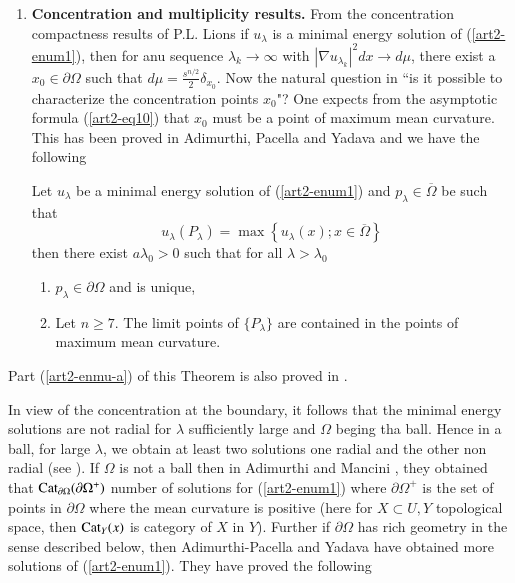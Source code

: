 \begin{enumerate}[{\rm \bf 1.}]
\item \textbf{Concentration and multiplicity results.} From the concentration compactness results of P.L. Lions \cite{art2-key17} if $u_{\lambda}$ is a minimal energy solution of (\ref{art2-enum1}), then for anu sequence $\lambda_{k} \rightarrow \infty$ with $|\nabla u_{\lambda_{k}}|^{2}dx \rightarrow d\mu$, there exist a $x_{0}\in \partial\Omega$ such that $d\mu = \frac{s^{n/2}}{2}\delta_{x_{0}}$. Now the natural question in ``is it possible to characterize the concentration points $x_{0}$"? One expects from the asymptotic formula (\ref{art2-eq10}) that $x_{0}$ must be a point of maximum mean curvature. This has been proved in Adimurthi, Pacella and Yadava \cite{art2-key7} and we have the following

\begin{theorem}\label{art2-thm6}
Let $u_{\lambda}$ be a minimal energy solution of (\ref{art2-enum1}) and $p_{\lambda} \in \overline{\Omega}$ be such that
$$
u_{\lambda}(P_{\lambda}) = \max\left\{u_{\lambda}(x) ; x\in \overline{\Omega}\right\}
$$
then there exist $a \lambda_{0} > 0$ such that for all $\lambda > \lambda_{0}$
\begin{enumerate}[{\rm a)}]
\item $p_{\lambda} \in \partial\Omega$ and is unique,\label{art2-enmu-a}
\item Let $n\geq 7$. The limit points of $\{P_{\lambda}\}$ are contained in the points of maximum mean curvature.\label{art2-enmu-b)} 
\end{enumerate}
\end{theorem}
\end{enumerate}
Part (\ref{art2-enmu-a}) of this Theorem is also proved in \cite{art2-key19}.

In view of the concentration at the boundary, it follows that the minimal energy solutions are not radial for $\lambda$ sufficiently large and $\Omega$ beging tha ball. Hence in a ball, for large $\lambda$, we obtain at  least two solutions one radial and the other non radial (see \cite{art2-key5}). If $\Omega$ is not a ball then in Adimurthi and Mancini \cite{art2-key2}, they obtained that $\operatorname{Cat}_{\partial\Omega}(\partial\Omega^{+})$ number of solutions for (\ref{art2-enum1}) where $\partial\Omega^{+}$ is the set of points in $\partial\Omega$ where the mean curvature is positive (here for $X \subset U, Y$ topological space, then $\operatorname{Cat}_{Y}(x)$ is category of $X$ in $Y$). Further if $\partial\Omega$ has rich geometry in the sense described below, then Adimurthi-Pacella and Yadava \cite{art2-key7} have obtained more solutions of (\ref{art2-enum1}). They have proved the following

